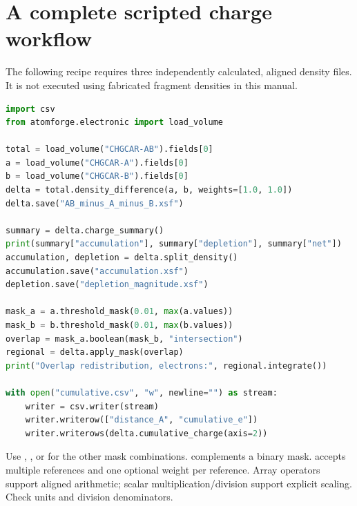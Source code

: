 \section{A complete scripted charge workflow}
The following recipe requires three independently calculated, aligned density files. It is not executed using fabricated fragment densities in this manual.
\begin{lstlisting}[language=Python]
import csv
from atomforge.electronic import load_volume

total = load_volume("CHGCAR-AB").fields[0]
a = load_volume("CHGCAR-A").fields[0]
b = load_volume("CHGCAR-B").fields[0]
delta = total.density_difference(a, b, weights=[1.0, 1.0])
delta.save("AB_minus_A_minus_B.xsf")

summary = delta.charge_summary()
print(summary["accumulation"], summary["depletion"], summary["net"])
accumulation, depletion = delta.split_density()
accumulation.save("accumulation.xsf")
depletion.save("depletion_magnitude.xsf")

mask_a = a.threshold_mask(0.01, max(a.values))
mask_b = b.threshold_mask(0.01, max(b.values))
overlap = mask_a.boolean(mask_b, "intersection")
regional = delta.apply_mask(overlap)
print("Overlap redistribution, electrons:", regional.integrate())

with open("cumulative.csv", "w", newline="") as stream:
    writer = csv.writer(stream)
    writer.writerow(["distance_A", "cumulative_e"])
    writer.writerows(delta.cumulative_charge(axis=2))
\end{lstlisting}
Use , , or  for the other mask combinations.  complements a binary mask.  accepts multiple references and one optional weight per reference. Array operators support aligned arithmetic; scalar multiplication/division support explicit scaling. Check units and division denominators.

